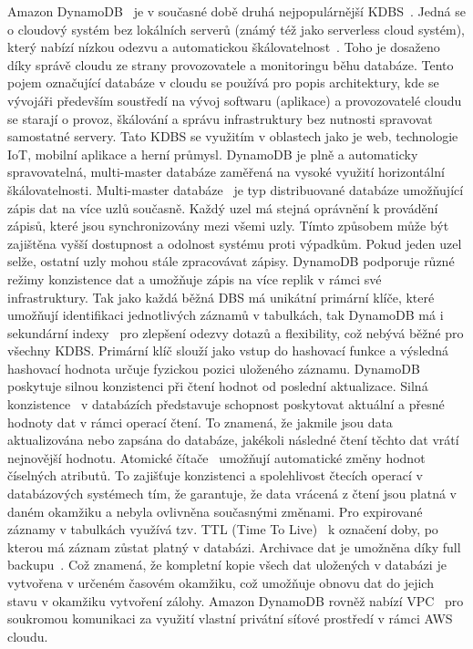 \documentclass[czech,master,dept460,male,csharp,cpdeclaration]{diploma}
\begin{document}
	Amazon DynamoDB~\cite{dynamodb} je v současné době druhá nejpopulárnější KDBS~\cite{dynamodb-dbengines-rank2}. Jedná se o cloudový systém bez lokálních serverů (známý též jako serverless cloud systém), který nabízí nízkou odezvu a automatickou škálovatelnost~\cite{dynamodb-autoscaling}. Toho je dosaženo díky správě cloudu ze strany provozovatele a monitoringu běhu databáze. Tento pojem označující databáze v cloudu se používá pro popis architektury, kde se vývojáři především soustředí na vývoj softwaru (aplikace) a provozovatelé cloudu se starají o provoz, škálování a správu infrastruktury bez nutnosti spravovat samostatné servery. Tato KDBS se využitím v oblastech jako je web, technologie IoT, mobilní aplikace a herní průmysl. DynamoDB je plně a automaticky spravovatelná, multi-master databáze zaměřená na vysoké využití horizontální škálovatelnosti. Multi-master databáze~\cite{postgres-multimaster-replication} je typ distribuované databáze umožňující zápis dat na více uzlů současně. Každý uzel má stejná oprávnění k provádění zápisů, které jsou synchronizovány mezi všemi uzly. Tímto způsobem může být zajištěna vyšší dostupnost a odolnost systému proti výpadkům. Pokud jeden uzel selže, ostatní uzly mohou stále zpracovávat zápisy. DynamoDB podporuje různé režimy konzistence dat a umožňuje zápis na více replik v rámci své infrastruktury. Tak jako každá běžná DBS má unikátní primární klíče, které umožňují identifikaci jednotlivých záznamů v tabulkách, tak DynamoDB má i sekundární indexy~\cite{dynamodb-secondary-index} pro zlepšení odezvy dotazů a flexibility, což nebývá běžné pro všechny KDBS. Primární klíč slouží jako vstup do hashovací funkce a výsledná hashovací hodnota určuje fyzickou pozici uloženého záznamu. DynamoDB poskytuje silnou konzistenci při čtení hodnot od poslední aktualizace. Silná konzistence~\cite{strong-consistency} v databázích představuje schopnost poskytovat aktuální a přesné hodnoty dat v rámci operací čtení. To znamená, že jakmile jsou data aktualizována nebo zapsána do databáze, jakékoli následné čtení těchto dat vrátí nejnovější hodnotu. Atomické čítače~\cite{atomic-counter} umožňují automatické změny hodnot číselných atributů. To zajišťuje konzistenci a spolehlivost čtecích operací v databázových systémech tím, že garantuje, že data vrácená z čtení jsou platná v daném okamžiku a nebyla ovlivněna současnými změnami. Pro expirované záznamy v tabulkách využívá tzv. TTL (Time To Live)~\cite{ttl} k označení doby, po kterou má záznam zůstat platný v databázi. Archivace dat je umožněna díky full backupu~\cite{full-backup}. Což znamená, že kompletní kopie všech dat uložených v databázi je vytvořena v určeném časovém okamžiku, což umožňuje obnovu dat do jejich stavu v okamžiku vytvoření zálohy. Amazon DynamoDB rovněž nabízí VPC~\cite{vpc} pro soukromou komunikaci za využití vlastní privátní síťové prostředí v rámci AWS cloudu.
	
\end{document}
